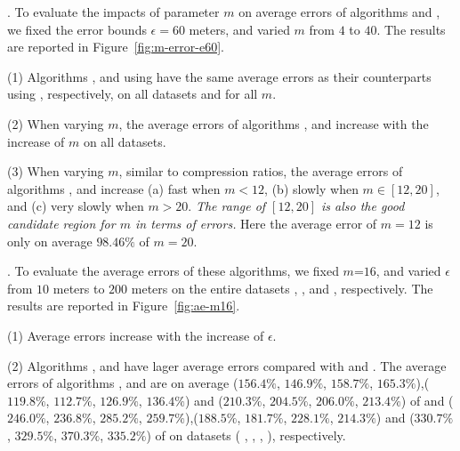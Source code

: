 .
To evaluate the impacts of parameter $m$ on average errors of algorithms \cist and \cista, we fixed the error bounds {$\epsilon =60$ meters}, and varied $m$ from $4$ to $40$. The results are reported in Figure~\ref{fig:m-error-e60}.



\ni(1) Algorithms \cisto, \cist and \cista using \rpia have the same average errors as their counterparts using \cpia, respectively, on all datasets and for all $m$.

\ni(2) When varying $m$, the average errors of algorithms \cisto, \cist and \cista increase with the increase of $m$ on all datasets.

\ni(3) When varying $m$, similar to compression ratios, the average errors of
algorithms \cisto, \cist and \cista increase (a) fast when $m < 12$, (b) slowly when $m
\in [12, 20]$, and (c) very slowly when $m > 20$.
\emph{The range of $[12, 20]$ is also the good candidate region for $m$ in terms of errors.}
Here the average error of $m=12$ is only on average {$98.46\%$} of $m=20$.




.
To evaluate the average errors of these algorithms, we fixed {$m$=$16$}, and
varied $\epsilon$ from $10$ meters to $200$ meters on the entire
{datasets} \sercar, \geolife, \mopsi and \pricar, respectively.
The results are reported in Figure~\ref{fig:ae-m16}.

\ni(1) Average errors increase with the increase of $\epsilon$.

\ni(2) Algorithms \cisto, \cist and \cista have lager average errors compared with \dps and \squishe.
The average errors of algorithms \cisto, \cist and \cista are on average
($156.4\%$, $146.9\%$, $158.7\%$, $165.3\%$),($119.8\%$, $112.7\%$, $126.9\%$,
$136.4\%$)
and ($210.3\%$, $204.5\%$, $206.0\%$, $213.4\%$)
of \dps and ($246.0\%$, $236.8\%$, $285.2\%$, $259.7\%$),($188.5\%$, $181.7\%$,
$228.1\%$, $214.3\%$)  and ($330.7\%$, $329.5\%$, $370.3\%$, $335.2\%$) of \squishe on
{datasets} ( \sercar, \geolife, \mopsi, \pricar), respectively.

